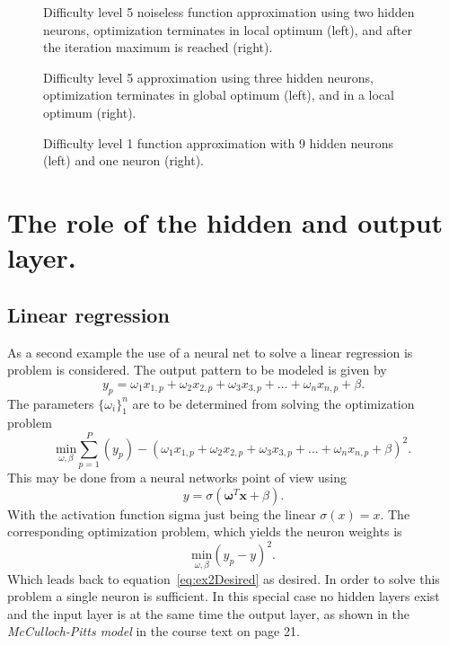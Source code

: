 \begin{figure}


\caption{Difficulty level 5 noiseless function approximation  using two hidden neurons, optimization terminates in local optimum (left), and after the iteration maximum is reached (right).}
\label{fig:NoNoise1}


\caption{Difficulty level 5 approximation  using three hidden neurons, optimization terminates in global optimum (left), and in a local optimum (right).}
\label{fig:NoNoise2}


\caption{Difficulty level 1 function approximation with 9 hidden neurons (left) and one neuron (right).}
\label{fig:NoNoise3}
\end{figure}

\section{The role of the hidden and output layer.}
\subsection{Linear regression}
As a second example the use of a neural net to solve a linear regression is problem is considered. The output pattern to be modeled is given by
\begin{equation}
y_p = \omega_1 x_{1,p} + \omega_2 x_{2,p} + \omega_3 x_{3,p} + \dots + \omega_n x_{n,p} + \beta.
\end{equation}
The parameters $\{\omega_{i}\}^n_1$ are to be determined from solving the optimization problem
\begin{equation}
\underset{\omega,\beta}{\text{min}} \sum^{P}_{p=1} (y_p) - (\omega_1 x_{1,p} + \omega_2 x_{2,p} + \omega_3 x_{3,p} + \dots + \omega_n x_{n,p} + \beta)^2.
\label{eq:ex2Desired}
\end{equation}
This may be done from a neural networks point of view using 
\begin{equation}
y = \sigma (\mathbf{\omega}^T \mathbf{x} + \beta).
\end{equation}
With the activation function sigma just being the linear $\sigma(x) = x$. The corresponding optimization problem, which yields the neuron weights is
\begin{equation}
\underset{\omega,\beta}{\text{min}} (y_p - y)^2.
\end{equation}
Which leads back to equation~\ref{eq:ex2Desired} as desired. In order to solve this problem a single neuron is sufficient. In this special case no hidden layers exist and the input layer is at the same time the output layer, as shown in the \textit{McCulloch-Pitts model} in the course text on page 21.

